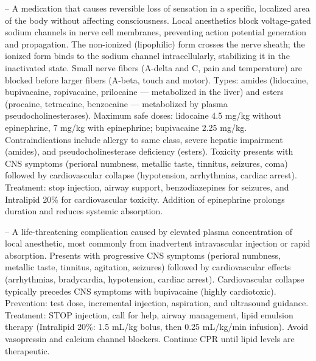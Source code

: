 -- A medication that causes reversible loss of sensation in a specific, localized area of the body without affecting consciousness. Local anesthetics block voltage-gated sodium channels in nerve cell membranes, preventing action potential generation and propagation. The non-ionized (lipophilic) form crosses the nerve sheath; the ionized form binds to the sodium channel intracellularly, stabilizing it in the inactivated state. Small nerve fibers (A-delta and C, pain and temperature) are blocked before larger fibers (A-beta, touch and motor). Types: amides (lidocaine, bupivacaine, ropivacaine, prilocaine — metabolized in the liver) and esters (procaine, tetracaine, benzocaine — metabolized by plasma pseudocholinesterases). Maximum safe doses: lidocaine 4.5 mg/kg without epinephrine, 7 mg/kg with epinephrine; bupivacaine 2.25 mg/kg. Contraindications include allergy to same class, severe hepatic impairment (amides), and pseudocholinesterase deficiency (esters). Toxicity presents with CNS symptoms (perioral numbness, metallic taste, tinnitus, seizures, coma) followed by cardiovascular collapse (hypotension, arrhythmias, cardiac arrest). Treatment: stop injection, airway support, benzodiazepines for seizures, and Intralipid 20\% for cardiovascular toxicity. Addition of epinephrine prolongs duration and reduces systemic absorption.

-- A life-threatening complication caused by elevated plasma concentration of local anesthetic, most commonly from inadvertent intravascular injection or rapid absorption. Presents with progressive CNS symptoms (perioral numbness, metallic taste, tinnitus, agitation, seizures) followed by cardiovascular effects (arrhythmias, bradycardia, hypotension, cardiac arrest). Cardiovascular collapse typically precedes CNS symptoms with bupivacaine (highly cardiotoxic). Prevention: test dose, incremental injection, aspiration, and ultrasound guidance. Treatment: STOP injection, call for help, airway management, lipid emulsion therapy (Intralipid 20\%: 1.5 mL/kg bolus, then 0.25 mL/kg/min infusion). Avoid vasopressin and calcium channel blockers. Continue CPR until lipid levels are therapeutic.

